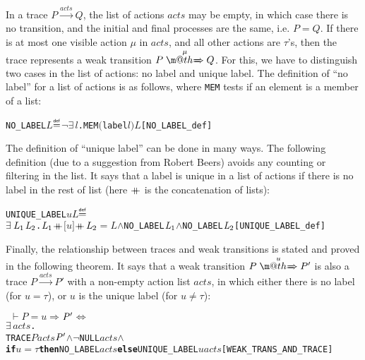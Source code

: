 \documentclass[GCNS]{yincog}
\makeatletter
\renewcommand{\HOLTokenDoublePlus}{\ensuremath{\mathbin{+\mkern -10mu+}}}
\renewcommand{\HOLConst}[1]{\texttt{#1}}
\renewcommand{\HOLBoundVar}[1]{\ensuremath{\mathit{#1}}}
\renewcommand{\HOLFreeVar}[1]{\ensuremath{\mathit{#1}}}
\renewcommand{\HOLKeyword}[1]{{\textbf{\textsf{#1}}}}
\renewcommand{\HOLSymConst}[1]{#1}
\renewcommand{\HOLTokenConj}{\ensuremath{\wedge}}
\renewcommand{\HOLTokenNeg}{\ensuremath{\neg}}
\def \rightarrowfillWEAK{$\m@th\mathord{\smash=}\mkern-6mu%
  \cleaders\hbox{$\mkern-2mu\mathord{\smash=}\mkern-2mu$}\hfill
  \mkern-6mu\mathord\Rightarrow$}
\renewcommand{\HOLTokenDefEquality}{\ensuremath{\mathrel{\overset{\makebox [0pt]{\text{\tiny \textsf{def}}}}{=}}}}
\renewcommand{\HOLTokenEquiv}{\ensuremath{\Longleftrightarrow}}
\renewcommand{\HOLTokenExists}{\ensuremath{\exists \,}}
\renewcommand{\HOLTokenTurnstile}{\ensuremath{\:\:\vdash}}
\theoremstyle{remark}
\theoremstyle{theorem}
\theoremstyle{remark}
\newcommand{\HOLTokenWeakTransBegin}{$=$}
\newcommand{\HOLTokenWeakTransEnd}{$\Rightarrow$\xspace}
\newcommand{\Arr}[1]{\mathrel{\stackrel{{\;\;#1\;\;}}{\mbox{\rightarrowfillWEAK}}}}
\makeatother
\begin{document}
In a trace $P\overset{acts}{\longrightarrow}Q$, the list of actions
$acts$ may be empty, in which case there is no transition, and the initial
and final processes are the same, i.e. $P = Q$. If there is at most one
visible action $\mu $ in $acts$, and all other actions are $\tau $'s, then
the trace represents a weak transition $P \Arr{\mu} Q$. For this, we have
to distinguish two cases in the list of actions: no label and unique label.
The definition of ``no label'' for a list of actions is as follows, where
\texttt{MEM} tests if an element is a member of a list:
%
\begin{alltt}
   \HOLConst{NO\_LABEL} \HOLFreeVar{L} \HOLTokenDefEquality{} \HOLSymConst{\HOLTokenNeg{}}\HOLSymConst{\HOLTokenExists{}}\HOLBoundVar{l}. \HOLConst{MEM} \ensuremath{(}\HOLConst{label} \HOLBoundVar{l}\ensuremath{)} \HOLFreeVar{L}\hfill{[NO\_LABEL\_def]}
\end{alltt}

The definition of ``unique label'' can be done in many ways. The following
definition (due to a suggestion from Robert Beers) avoids any counting
or filtering in the list. It says that a label is unique in a list of actions
if there is no label in the rest of list (here
$\HOLTokenDoublePlus $ is the concatenation of lists):
%
\begin{alltt}
   \HOLConst{UNIQUE\_LABEL} \HOLFreeVar{u} \HOLFreeVar{L} \HOLTokenDefEquality{}
     \HOLSymConst{\HOLTokenExists{}}\ensuremath{\HOLBoundVar{L}\sb{\mathrm{1}}} \ensuremath{\HOLBoundVar{L}\sb{\mathrm{2}}}. \ensuremath{\HOLBoundVar{L}\sb{\mathrm{1}}} \HOLSymConst{\HOLTokenDoublePlus} \ensuremath{[}\HOLFreeVar{u}\ensuremath{]} \HOLSymConst{\HOLTokenDoublePlus} \ensuremath{\HOLBoundVar{L}\sb{\mathrm{2}}} \HOLSymConst{\ensuremath{=}} \HOLFreeVar{L} \HOLSymConst{\HOLTokenConj{}} \HOLConst{NO\_LABEL} \ensuremath{\HOLBoundVar{L}\sb{\mathrm{1}}} \HOLSymConst{\HOLTokenConj{}} \HOLConst{NO\_LABEL} \ensuremath{\HOLBoundVar{L}\sb{\mathrm{2}}}\hfill{[UNIQUE\_LABEL\_def]}
\end{alltt}

Finally, the relationship between traces and weak transitions is stated
and proved in the following theorem. It says that a weak transition
$P \Arr{u} P'$ is also a trace $P\overset{acts}{\longrightarrow}P'$ with
a non-empty action list $acts$, in which either there is no label (for
$u = \tau $), or $u$ is the unique label (for $u \neq \tau $):
%
\begin{alltt}
\HOLTokenTurnstile{} \HOLFreeVar{P} \HOLTokenWeakTransBegin\HOLFreeVar{u}\HOLTokenWeakTransEnd \ensuremath{\HOLFreeVar{P}\sp{\prime}} \HOLSymConst{\HOLTokenEquiv{}}
   \HOLSymConst{\HOLTokenExists{}}\HOLBoundVar{acts}.
       \HOLConst{TRACE} \HOLFreeVar{P} \HOLBoundVar{acts} \ensuremath{\HOLFreeVar{P}\sp{\prime}} \HOLSymConst{\HOLTokenConj{}} \HOLSymConst{\HOLTokenNeg{}}\HOLConst{NULL} \HOLBoundVar{acts} \HOLSymConst{\HOLTokenConj{}}
       \HOLKeyword{if} \HOLFreeVar{u} \HOLSymConst{\ensuremath{=}} \HOLSymConst{\ensuremath{\tau}} \HOLKeyword{then} \HOLConst{NO\_LABEL} \HOLBoundVar{acts} \HOLKeyword{else} \HOLConst{UNIQUE\_LABEL} \HOLFreeVar{u} \HOLBoundVar{acts}\hfill{[WEAK\_TRANS\_AND\_TRACE]}
\end{alltt}
\end{document}
